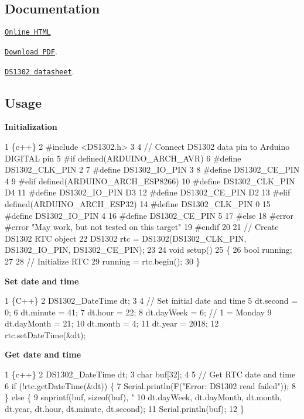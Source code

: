 \subsection*{Documentation}


\begin{DoxyItemize}
\item \href{https://erriez.github.io/ErriezDS1302}{\tt Online H\+T\+ML}
\item \href{https://github.com/Erriez/ErriezDS1302/raw/gh-pages/latex/ErriezDS1302.pdf}{\tt Download P\+DF}.
\item \href{https://www.google.com/search?q=DS1302+datasheet}{\tt D\+S1302 datasheet}.
\end{DoxyItemize}

\subsection*{Usage}

{\bfseries Initialization}


\begin{DoxyCode}
1 \{c++\}
2 #include <DS1302.h>
3 
4 // Connect DS1302 data pin to Arduino DIGITAL pin
5 #if defined(ARDUINO\_ARCH\_AVR)
6 #define DS1302\_CLK\_PIN      2
7 #define DS1302\_IO\_PIN       3
8 #define DS1302\_CE\_PIN       4
9 #elif defined(ARDUINO\_ARCH\_ESP8266)
10 #define DS1302\_CLK\_PIN      D4
11 #define DS1302\_IO\_PIN       D3
12 #define DS1302\_CE\_PIN       D2
13 #elif defined(ARDUINO\_ARCH\_ESP32)
14 #define DS1302\_CLK\_PIN      0
15 #define DS1302\_IO\_PIN       4
16 #define DS1302\_CE\_PIN       5
17 #else
18 #error #error "May work, but not tested on this target"
19 #endif
20 
21 // Create DS1302 RTC object
22 DS1302 rtc = DS1302(DS1302\_CLK\_PIN, DS1302\_IO\_PIN, DS1302\_CE\_PIN);
23 
24 void setup()
25 \{
26     bool running;
27 
28     // Initialize RTC
29     running = rtc.begin();
30 \}
\end{DoxyCode}


{\bfseries Set date and time}


\begin{DoxyCode}
1 \{C++\}
2 DS1302\_DateTime dt;
3 
4 // Set initial date and time
5 dt.second = 0;
6 dt.minute = 41;
7 dt.hour = 22;
8 dt.dayWeek = 6; // 1 = Monday
9 dt.dayMonth = 21;
10 dt.month = 4;
11 dt.year = 2018;
12 rtc.setDateTime(&dt);
\end{DoxyCode}


{\bfseries Get date and time}


\begin{DoxyCode}
1 \{c++\}
2 DS1302\_DateTime dt;
3 char buf[32];
4 
5 // Get RTC date and time
6 if (!rtc.getDateTime(&dt)) \{
7     Serial.println(F("Error: DS1302 read failed"));
8 \} else \{
9     snprintf(buf, sizeof(buf), "%
10              dt.dayWeek, dt.dayMonth, dt.month, dt.year, dt.hour, dt.minute, dt.second);
11     Serial.println(buf);
12 \}
\end{DoxyCode}


